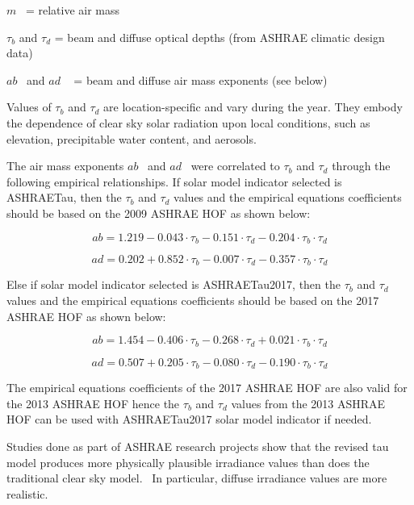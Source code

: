 \emph{\(m\)}~ = relative air mass

$\tau$\(_{b}\) and $\tau$\(_{d}\) = beam and diffuse optical depths (from ASHRAE climatic design data)

\(ab\) ~and \(ad\) ~ = beam and diffuse air mass exponents (see below)

Values of $\tau$\(_{b}\) and $\tau$\(_{d}\) are location-specific and vary during the year. They embody the dependence of clear sky solar radiation upon local conditions, such as elevation, precipitable water content, and aerosols.

The air mass exponents \(ab\) ~and \(ad\) ~were correlated to $\tau$\(_{b}\) and $\tau$\(_{d}\) through the following empirical relationships. If solar model indicator selected is ASHRAETau, then the $\tau$\(_{b}\) and $\tau$\(_{d}\) values and the empirical equations coefficients should be based on the 2009 ASHRAE HOF as shown below:

\begin{equation}
ab = 1.219 - 0.043 \cdot {\tau_b} - 0.151 \cdot {\tau_d} - 0.204 \cdot {\tau_b} \cdot {\tau_d}
\end{equation}

\begin{equation}
ad = 0.202 + 0.852 \cdot {\tau_b} - 0.007 \cdot {\tau_d} - 0.357 \cdot {\tau_b} \cdot {\tau_d}
\end{equation}

Else if solar model indicator selected is ASHRAETau2017, then the $\tau$\(_{b}\) and $\tau$\(_{d}\) values and the empirical equations coefficients should be based on the 2017 ASHRAE HOF as shown below:

\begin{equation}
ab = 1.454 - 0.406 \cdot {\tau_b} - 0.268 \cdot {\tau_d} + 0.021 \cdot {\tau_b} \cdot {\tau_d}
\end{equation}

\begin{equation}
ad = 0.507 + 0.205 \cdot {\tau_b} - 0.080 \cdot {\tau_d} - 0.190 \cdot {\tau_b} \cdot {\tau_d}
\end{equation}

The empirical equations coefficients of the 2017 ASHRAE HOF are also valid for the 2013 ASHRAE HOF hence the $\tau$\(_{b}\) and $\tau$\(_{d}\) values from the 2013 ASHRAE HOF can be used with ASHRAETau2017 solar model indicator if needed. 

Studies done as part of ASHRAE research projects show that the revised tau model produces more physically plausible irradiance values than does the traditional clear sky model.~ In particular, diffuse irradiance values are more realistic.

